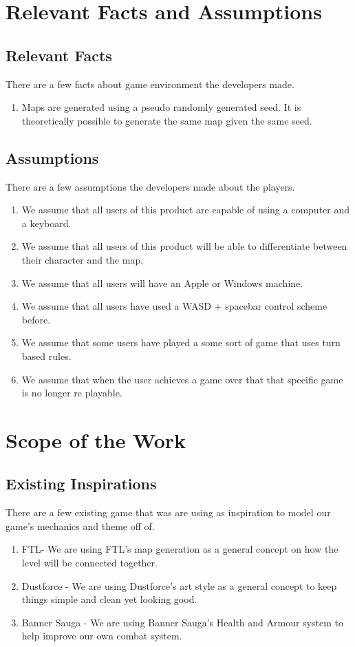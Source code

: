 \documentclass{article}
\begin{document}
\section{Relevant Facts and Assumptions}
\subsection{Relevant Facts}
\quad There are a few facts about game environment the developers made.
\begin{enumerate}[{RF}1. ]
	\item Maps are generated using a pseudo randomly generated seed. It is theoretically possible to generate the same map given the same seed.
\end{enumerate}
\subsection{Assumptions}
\quad There are a few assumptions the developers made about the players.
\begin{enumerate}[{A}1. ]
	\item We assume that all users of this product are capable of using a computer and a keyboard. 
	\item We assume that all users of this product will be able to differentiate between their character and the map.
	\item We assume that all users will have an Apple or Windows machine.
	\item We assume that all users have used a WASD + spacebar control scheme before.
	\item We assume that some users have played a some sort of game that uses turn based rules.
	\item We assume that when the user achieves a game over that that specific game is no longer re playable.
\end{enumerate}
\section{Scope of the Work}
\subsection{Existing Inspirations}
\quad There are a few existing game that was are using as inspiration to model our game's mechanics and theme off of.
\begin{enumerate}[{EI}1. ]
	\item FTL- We are using FTL's map generation as a general concept on how the level will be connected together.
	\item Dustforce - We are using Dustforce's art style as a general concept to keep things simple and clean yet looking good.
	\item Banner Sauga - We are using Banner Sauga's Health and Armour system to help improve our own combat system.  
\end{enumerate}
\end{document}
